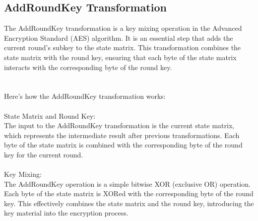\documentclass{report}
\begin{document}
\subsection{AddRoundKey Transformation}
The AddRoundKey transformation is a key mixing operation in the Advanced Encryption Standard (AES) algorithm. It is an essential step that adds the current round's subkey to the state matrix. This transformation combines the state matrix with the round key, ensuring that each byte of the state matrix interacts with the corresponding byte of the round key.\\
\\
\\
Here's how the AddRoundKey transformation works:\\
\\
State Matrix and Round Key:\\
The input to the AddRoundKey transformation is the current state matrix, which represents the intermediate result after previous transformations. Each byte of the state matrix is combined with the corresponding byte of the round key for the current round.\\
\\
Key Mixing:\\
The AddRoundKey operation is a simple bitwise XOR (exclusive OR) operation. Each byte of the state matrix is XORed with the corresponding byte of the round key. This effectively combines the state matrix and the round key, introducing the key material into the encryption process.
\end{document}
